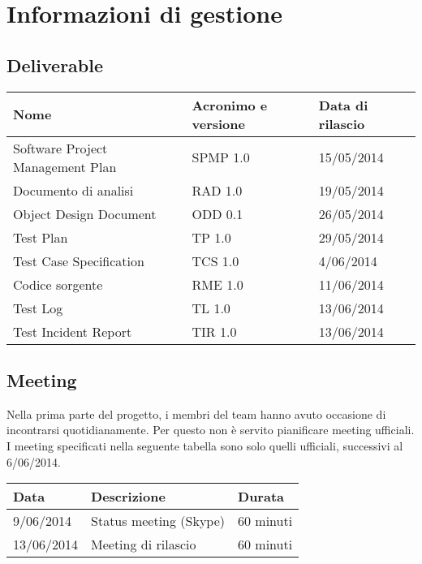 \chapter{Informazioni di gestione}
\section{Deliverable}

\begin{table}[ht]
  \centering
  \begin{tabular}{|p{5cm}|p{3cm}|p{4cm}|}
    \hline
    \rowcolor{Gray}\textbf{Nome}	& \textbf{Acronimo e versione}			& \textbf{Data di rilascio}\\
    \hline
    Software Project Management Plan	& SPMP 1.0					& 15/05/2014		   \\
    \hline
    Documento di analisi		& RAD 1.0					& 19/05/2014		   \\
    \hline
    Object Design Document		& ODD 0.1					& 26/05/2014		   \\
    \hline
    Test Plan				& TP 1.0					& 29/05/2014		   \\
    \hline
    Test Case Specification		& TCS 1.0					& 4/06/2014		   \\
    \hline
    Codice sorgente			& RME 1.0					& 11/06/2014		   \\
    \hline
    Test Log				& TL 1.0					& 13/06/2014		   \\
    \hline
    Test Incident Report		& TIR 1.0					& 13/06/2014		   \\
    \hline
  \end{tabular}
\end{table}

\section{Meeting}
Nella prima parte del progetto, i membri del team hanno avuto occasione di incontrarsi quotidianamente. Per questo non è servito pianificare meeting ufficiali. I meeting specificati nella seguente tabella sono solo quelli ufficiali, successivi al 6/06/2014.

\begin{table}[ht]
  \centering
  \begin{tabular}{|p{3cm}|p{5cm}|p{3cm}|}
  \hline
  \rowcolor{Gray}\textbf{Data}		& \textbf{Descrizione}			& \textbf{Durata}			\\
  \hline
  9/06/2014				& Status meeting (Skype)		& 60 minuti				\\
  \hline
  13/06/2014				& Meeting di rilascio			& 60 minuti				\\
  \hline
  \end{tabular}
\end{table}
